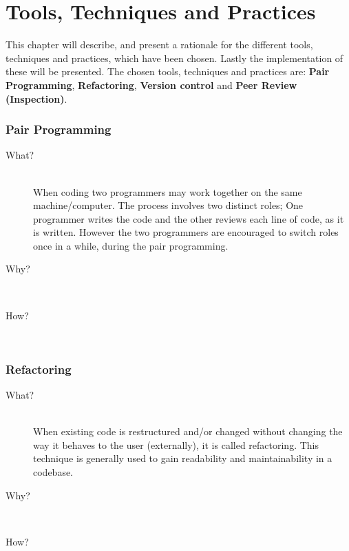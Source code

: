
\chapter{Tools, Techniques and Practices} %
\label{cha:tools_techniques_and_practices}
This chapter will describe, and present a rationale for the different tools, techniques and practices, which have been chosen.
Lastly the implementation of these will be presented.
The chosen tools, techniques and practices are: \textbf{Pair Programming}, \textbf{Refactoring}, \textbf{Version control} and \textbf{Peer Review (Inspection)}.

\subsection*{Pair Programming} %
\label{sub:pair_programming}
\begin{description}
    \item[What?]\hfill\\
    When coding two programmers may work together on the same machine/computer.
The process involves two distinct roles; One programmer writes the code and the other reviews each line of code, as it is written. However the two programmers are encouraged to switch roles once in a while, during the pair programming.

    \item[Why?]\hfill\\ 
    
    
    \item[How?]\hfill\\
    
\end{description}
\subsection*{Refactoring} %
\label{sub:refactoring}
\begin{description}
    \item[What?]\hfill\\
    When existing code is restructured and/or changed without changing the way it behaves to the user (externally), it is called refactoring.
    This technique is generally used to gain readability and maintainability in a codebase.

    \item[Why?]\hfill\\ 
    
    
    \item[How?]\hfill\\
        
\end{description}                       
